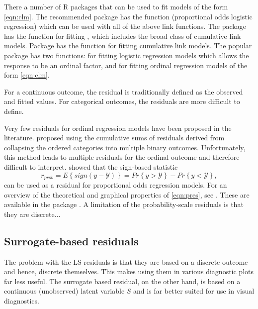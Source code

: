 There a number of R packages that can be used to fit models of the form \eqref{eqn:clm}. The recommended package  \citep{pkg-MASS} has the function  (proportional odds logistic regression) which can be used with all of the above link functions. The  \citep{pkg-VGAM} package has the  function for fitting , which includes the broad class of cumulative link models. Package  \citep{pkg-ordinal} has the  function for fitting cumulative link models. The popular  package \citep{pkg-rms} has two functions:  for fitting logistic regression models which allows the response to be an ordinal factor, and  for fitting ordinal regression models of the form \eqref{eqn:clm}.

For a continuous outcome, the residual is traditionally defined as the observed and fitted values. For categorical outcomes, the residuals are more difficult to define.

Very few residuals for ordinal regression models have been proposed in the literature. \citet{graphical-liu-2009} proposed using the cumulative sums of residuals derived from collapsing the ordered categories into multiple binary outcomes. Unfortunately, this method leads to multiple residuals for the ordinal outcome and therefore difficult to interpret. \citet{residuals-li-2012} showed that the sign-based statistic
\begin{equation}
\label{eqn:pres}
  r_{prob} = E\left\{sign\left(y - \mathcal{Y}\right)\right\} = Pr\left\{y > \mathcal{Y}\right\} - Pr\left\{y < \mathcal{Y}\right\},
\end{equation}
can be used as a residual for proportional odds regression models. For an overview of the theoretical and graphical properties of \eqref{eqn:pres}, see \citet{residuals-liu-2017}. These are available in the  package \citep{pkg-PResiduals}. A limitation of the probability-scale residuals is that they are discrete...


\subsection{Surrogate-based residuals}

The problem with the LS residuals is that they are based on a discrete outcome and hence, discrete themselves. This makes using them in various diagnostic plots far less useful. The surrogate based residual, on the other hand, is based on a continuous (unobserved) latent variable $S$ and is far better suited for use in visual diagnostics.

